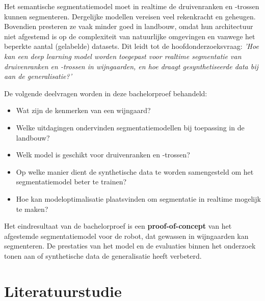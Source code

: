 Het semantische segmentatiemodel moet in realtime de druivenranken en -trossen kunnen segmenteren. Dergelijke modellen vereisen veel rekenkracht en geheugen. Bovendien presteren ze vaak minder goed in landbouw, omdat hun architectuur niet afgestemd is op de complexiteit van natuurlijke omgevingen en vanwege het beperkte aantal (gelabelde) datasets. Dit leidt tot de hoofdonderzoeksvraag: \emph{'Hoe kan een deep learning model worden toegepast voor realtime segmentatie van druivenranken en -trossen in wijngaarden, en hoe draagt gesynthetiseerde data bij aan de generalisatie?'}

De volgende deelvragen worden in deze bachelorproef behandeld:
\begin{itemize}
    \setlength{\itemsep}{0pt}
    \setlength{\parskip}{0pt}
    \item Wat zijn de kenmerken van een wijngaard?
    \item Welke uitdagingen ondervinden segmentatiemodellen bij toepassing in de landbouw?
    \item Welk model is geschikt voor druivenranken en -trossen?
    \item Op welke manier dient de synthetische data te worden samengesteld om het segmentatiemodel beter te trainen?
    \item Hoe kan modeloptimalisatie plaatsvinden om segmentatie in realtime mogelijk te maken?
\end{itemize}

Het eindresultaat van de bachelorproef is een \textbf{proof-of-concept} van het afgestemde segmentatiemodel voor de robot, dat gewassen in wijngaarden kan segmenteren. De prestaties van het model en de evaluaties binnen het onderzoek tonen aan of synthetische data de generalisatie heeft verbeterd.


\section{Literatuurstudie}%
\label{sec:literatuurstudie}

